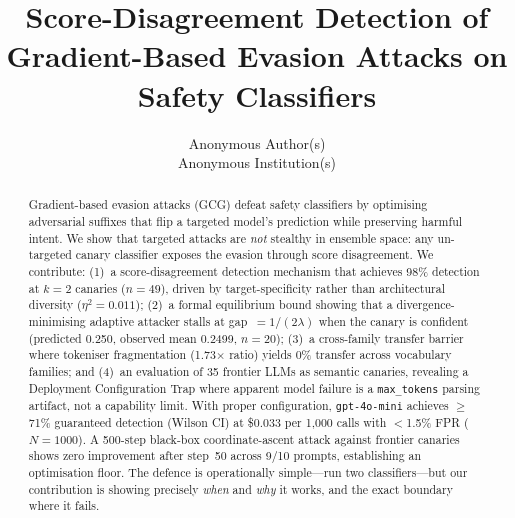\documentclass{article}
\title{Score-Disagreement Detection of Gradient-Based Evasion Attacks on Safety Classifiers}
\author{
Anonymous Author(s) \\
Anonymous Institution(s)
}
\begin{document}
\maketitle

\begin{abstract}
Gradient-based evasion attacks (GCG) defeat safety classifiers by optimising adversarial suffixes that flip a targeted model's prediction while preserving harmful intent. We show that targeted attacks are \emph{not} stealthy in ensemble space: any un-targeted canary classifier exposes the evasion through score disagreement. We contribute: (1)~a score-disagreement detection mechanism that achieves 98\% detection at $k{=}2$ canaries ($n{=}49$), driven by target-specificity rather than architectural diversity ($\eta^2 = 0.011$); (2)~a formal equilibrium bound showing that a divergence-minimising adaptive attacker stalls at gap~$= 1/(2\lambda)$ when the canary is confident (predicted 0.250, observed mean 0.2499, $n{=}20$); (3)~a cross-family transfer barrier where tokeniser fragmentation (1.73$\times$ ratio) yields 0\% transfer across vocabulary families; and (4)~an evaluation of 35 frontier LLMs as semantic canaries, revealing a Deployment Configuration Trap where apparent model failure is a \texttt{max\_tokens} parsing artifact, not a capability limit. With proper configuration, \texttt{gpt-4o-mini} achieves $\geq$71\% guaranteed detection (Wilson CI) at \$0.033 per 1{,}000 calls with $<$1.5\% FPR ($N{=}1000$). A 500-step black-box coordinate-ascent attack against frontier canaries shows zero improvement after step~50 across 9/10 prompts, establishing an optimisation floor. The defence is operationally simple---run two classifiers---but our contribution is showing precisely \emph{when} and \emph{why} it works, and the exact boundary where it fails.
\end{abstract}

\begin{table}[h]
\centering
\small
{}
\end{table}
\end{document}
